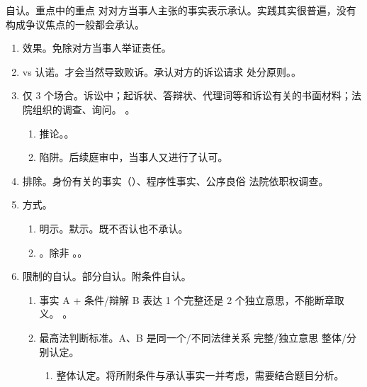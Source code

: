 \begin{enumerate}
        \begin{kk}{自认。重点中的重点}
          对对方当事人主张的事实表示承认。实践其实很普遍，没有构成争议焦点的一般都会承认。
          \begin{enumerate}
            \item 效果。免除对方当事人举证责任。
            \item vs 认诺。才会当然导致败诉。承认对方的诉讼请求 \yjt 处分原则。。
            \item 仅 3 个场合。诉讼中；起诉状、答辩状、代理词等和诉讼有关的书面材料；法院组织的调查、询问。
                  。
                  \begin{enumerate}
                    \item 推论。。
                    \item \sjt 陷阱。后续庭审中，当事人又进行了认可。
                  \end{enumerate}
            \item 排除。身份有关的事实（）、程序性事实、公序良俗 \yjt 法院依职权调查。
            \item 方式。
                  \begin{enumerate}
                    \item \yi 明示。\er 默示。既不否认也不承认。
                    \item {}。除非 \yi {}。\er {}。
                  \end{enumerate}
            \item 限制的自认。\yi 部分自认。\er 附条件自认。
                  \begin{enumerate}
                    \item 事实 A + 条件/辩解 B 表达 1 个完整还是 2 个独立意思，不能断章取义。
                          。
                    \item 最高法判断标准。A、B 是同一个/不同法律关系 \yjt 完整/独立意思 \yjt 整体/分别认定。
                          \begin{enumerate}
                            \item 整体认定。将所附条件与承认事实一并考虑，需要结合题目分析。\\
                                  \yi\, 
\end{enumerate}
\end{enumerate}
\end{enumerate}
\end{kk}
\end{enumerate}
